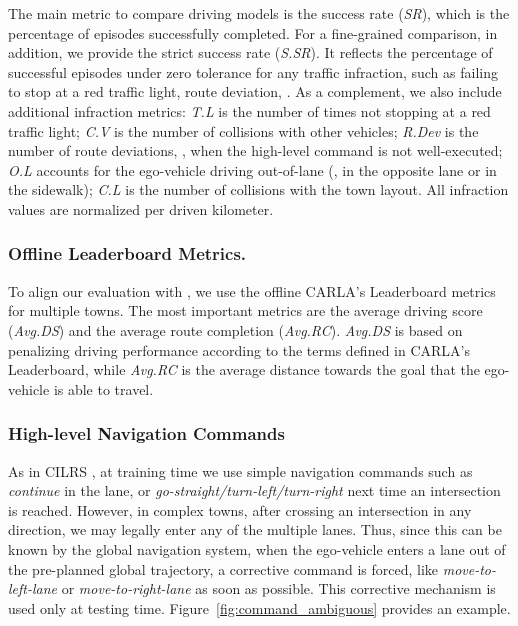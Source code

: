 The main metric to compare driving models is the success rate (\emph{SR}), which is the percentage of episodes successfully completed. 
For a fine-grained comparison, in addition, we provide the strict success rate (\emph{S.SR}). 
It reflects the percentage of successful episodes under zero tolerance for any traffic infraction, such as failing to stop at a red traffic light, route deviation, {\etc}. 
As a complement, we also include additional infraction metrics: \emph{T.L} is the number of times not stopping at a red traffic light; 
\emph{C.V} is the number of collisions with other vehicles; 
\emph{R.Dev} is the number of route deviations, {\ie}, when the high-level command is not well-executed; 
\emph{O.L} accounts for the ego-vehicle driving out-of-lane ({\eg}, in the opposite lane or in the sidewalk); 
\emph{C.L} is the number of collisions with the town layout. 
All infraction values are normalized per driven kilometer.


\subsubsection{Offline Leaderboard Metrics.}\label{lb_metrics}
To align our evaluation with \cite{Hu:2022}, we use the offline CARLA's Leaderboard metrics for multiple towns. 
The most important metrics are the average driving score (\emph{Avg.DS}) and the average route completion (\emph{Avg.RC}). 
\emph{Avg.DS} is based on penalizing driving performance according to the terms defined in CARLA's Leaderboard, while \emph{Avg.RC} is the average distance towards the goal that the ego-vehicle is able to travel.


\subsubsection{High-level Navigation Commands} 
As in CILRS \cite{Codevilla:2019}, at training time we use simple navigation commands such as \emph{continue} in the lane, or \emph{go-straight/turn-left/turn-right} next time an intersection is reached. 
However, in complex towns, after crossing an intersection in any direction, we may legally enter any of the multiple lanes. 
Thus, since this can be known by the global navigation system, when the ego-vehicle enters a lane out of the pre-planned global trajectory, a corrective command is forced, like \emph{move-to-left-lane} or  \emph{move-to-right-lane} as soon as possible. 
This corrective mechanism is used only at testing time. 
Figure~\ref{fig:command_ambiguous} provides an example.


